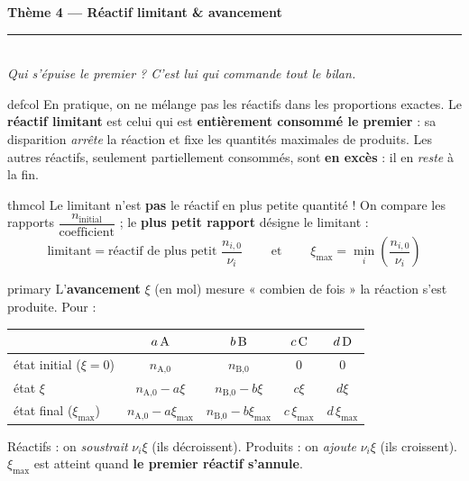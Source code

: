 \documentclass[11pt,a4paper]{article}
\newcommand{\nq}[1]{n_{\text{#1}}}
\begin{document}
\begin{center}
{\LARGE\bfseries\color{primarydark}Thème 4 — Réactif limitant \& avancement}\\[1pt]
{\color{primary}\rule{0.5\linewidth}{1.2pt}}\\[2pt]
{\itshape Qui s'épuise le premier ? C'est lui qui commande tout le bilan.}
\end{center}
\vspace{-3pt}

\begin{tutobox}{defcol}
En pratique, on ne mélange pas les réactifs dans les proportions exactes. Le \textbf{réactif
limitant} est celui qui est \textbf{entièrement consommé le premier} : sa disparition
\emph{arrête} la réaction et fixe les quantités maximales de produits. Les autres réactifs, seulement
partiellement consommés, sont \textbf{en excès} : il en \emph{reste} à la fin.
\end{tutobox}

\begin{tutobox}{thmcol}
Le limitant n'est \textbf{pas} le réactif en plus petite quantité ! On compare les rapports
$\dfrac{n_{\text{initial}}}{\text{coefficient}}$ ; le \textbf{plus petit rapport} désigne le limitant :
\[
\boxed{\;\text{limitant} = \text{réactif de plus petit } \dfrac{n_{i,0}}{\nu_i}\;}
\qquad\text{et}\qquad
\boxed{\;\xi_{\max}=\min_i\!\left(\dfrac{n_{i,0}}{\nu_i}\right)\;}
\]
\end{tutobox}

\begin{tutobox}{primary}
L'\textbf{avancement} $\xi$ (en mol) mesure « combien de fois » la réaction s'est produite. Pour
 :
\begin{center}\renewcommand{\arraystretch}{1.25}\small
\begin{tabular}{l|cccc}
 & $a\,\ce{A}$ & $b\,\ce{B}$ & $c\,\ce{C}$ & $d\,\ce{D}$\\ \hline
état initial ($\xi=0$) & $\nq{A,0}$ & $\nq{B,0}$ & $0$ & $0$\\
état $\xi$ & $\nq{A,0}-a\xi$ & $\nq{B,0}-b\xi$ & $c\xi$ & $d\xi$\\
état final ($\xi_{\max}$) & $\nq{A,0}-a\xi_{\max}$ & $\nq{B,0}-b\xi_{\max}$ & $c\,\xi_{\max}$ & $d\,\xi_{\max}$\\
\end{tabular}
\end{center}
Réactifs : on \emph{soustrait} $\nu_i\xi$ (ils décroissent). Produits : on \emph{ajoute} $\nu_i\xi$
(ils croissent). $\xi_{\max}$ est atteint quand \textbf{le premier réactif s'annule}.
\end{tutobox}
\end{document}
